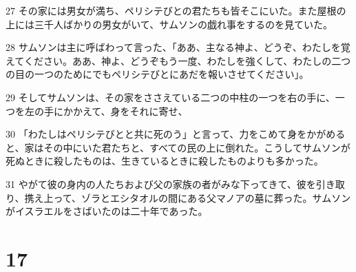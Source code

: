 \par 27 その家には男女が満ち、ペリシテびとの君たちも皆そこにいた。また屋根の上には三千人ばかりの男女がいて、サムソンの戯れ事をするのを見ていた。
\par 28 サムソンは主に呼ばわって言った、「ああ、主なる神よ、どうぞ、わたしを覚えてください。ああ、神よ、どうぞもう一度、わたしを強くして、わたしの二つの目の一つのためにでもペリシテびとにあだを報いさせてください」。
\par 29 そしてサムソンは、その家をささえている二つの中柱の一つを右の手に、一つを左の手にかかえて、身をそれに寄せ、
\par 30 「わたしはペリシテびとと共に死のう」と言って、力をこめて身をかがめると、家はその中にいた君たちと、すべての民の上に倒れた。こうしてサムソンが死ぬときに殺したものは、生きているときに殺したものよりも多かった。
\par 31 やがて彼の身内の人たちおよび父の家族の者がみな下ってきて、彼を引き取り、携え上って、ゾラとエシタオルの間にある父マノアの墓に葬った。サムソンがイスラエルをさばいたのは二十年であった。

\chapter{17}

